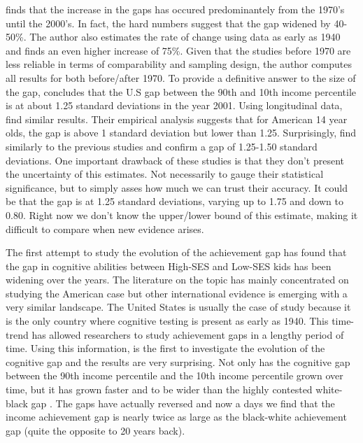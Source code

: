 \documentclass[11pt, a4paper]{article}\usepackage[]{graphicx}\usepackage[]{color}
\begin{document}
\citet{reardon2011} finds that the increase in the gaps has occured predominantely from the 1970's until the 2000's. In fact, the hard numbers suggest that the gap widened by 40-50\%. The author also estimates the rate of change using data as early as 1940 and finds an even higher increase of   75\%. Given that the studies before 1970 are less reliable in terms of comparability and sampling design, the author computes all results for both before/after 1970. To provide a definitive answer to the size of the gap, \citet{reardon2011} concludes that the U.S gap between the 90th and 10th income percentile is at about 1.25 standard deviations in the year 2001. Using longitudinal data, \citet{bradbury2015} find similar results. Their empirical analysis suggests that for American 14 year olds, the gap is above 1 standard deviation but lower than 1.25. Surprisingly, \citet{duncan2011} find similarly to the previous studies and confirm a gap of  1.25-1.50 standard deviations. One important drawback of these studies is that they don't present the uncertainty of this estimates. Not necessarily to gauge their statistical significance, but to simply asses how much we can trust their accuracy. It could be that the gap is at  1.25 standard deviations, varying up to 1.75 and down to 0.80. Right now we don't know the upper/lower bound of this estimate, making it difficult to compare when new evidence arises.

The first attempt to study the evolution of the achievement gap has found that the gap in cognitive abilities between High-SES and Low-SES kids has been widening over the years. The literature on the topic has mainly concentrated on studying the American case \citep{reardon2011} but other international evidence \citep{anna2016_global} is emerging with a very similar landscape. The United States is usually the case of study because it is the only country where cognitive testing is present as early as 1940. This time-trend has allowed researchers to study achievement gaps in a lengthy period of time. Using this information, \citet{reardon2011} is the first to investigate the evolution of the cognitive gap and the results are very surprising. Not only has the cognitive gap between the 90th income percentile and the 10th income percentile grown over time, but it has grown faster and to be wider than the highly contested white-black gap \citep{magnuson2008}. The gaps have actually reversed and now a days we find that the income achievement gap is nearly twice as large as the black-white achievement gap (quite the opposite to 20 years back).
\end{document}
